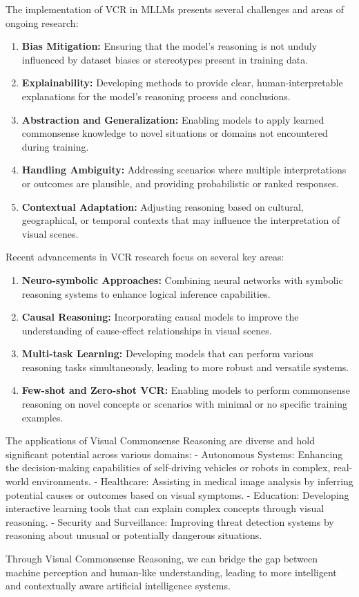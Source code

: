 The implementation of VCR in MLLMs presents several challenges and areas of ongoing research:

\begin{enumerate}
    \item \textbf{Bias Mitigation:} Ensuring that the model's reasoning is not unduly influenced by dataset biases or stereotypes present in training data.
    \item \textbf{Explainability:} Developing methods to provide clear, human-interpretable explanations for the model's reasoning process and conclusions.
    \item \textbf{Abstraction and Generalization:} Enabling models to apply learned commonsense knowledge to novel situations or domains not encountered during training.
    \item \textbf{Handling Ambiguity:} Addressing scenarios where multiple interpretations or outcomes are plausible, and providing probabilistic or ranked responses.
    \item \textbf{Contextual Adaptation:} Adjusting reasoning based on cultural, geographical, or temporal contexts that may influence the interpretation of visual scenes.
\end{enumerate}


Recent advancements in VCR research focus on several key areas:

\begin{enumerate}
    \item \textbf{Neuro-symbolic Approaches:} Combining neural networks with symbolic reasoning systems to enhance logical inference capabilities.
    \item \textbf{Causal Reasoning:} Incorporating causal models to improve the understanding of cause-effect relationships in visual scenes.
    \item \textbf{Multi-task Learning:} Developing models that can perform various reasoning tasks simultaneously, leading to more robust and versatile systems.
    \item \textbf{Few-shot and Zero-shot VCR:} Enabling models to perform commonsense reasoning on novel concepts or scenarios with minimal or no specific training examples.
\end{enumerate}

The applications of Visual Commonsense Reasoning are diverse and hold significant potential across various domains:
- Autonomous Systems: Enhancing the decision-making capabilities of self-driving vehicles or robots in complex, real-world environments.
- Healthcare: Assisting in medical image analysis by inferring potential causes or outcomes based on visual symptoms.
- Education: Developing interactive learning tools that can explain complex concepts through visual reasoning.
- Security and Surveillance: Improving threat detection systems by reasoning about unusual or potentially dangerous situations.

Through Visual Commonsense Reasoning, we can bridge the gap between machine perception and human-like understanding, leading to more intelligent and contextually aware artificial intelligence systems.




